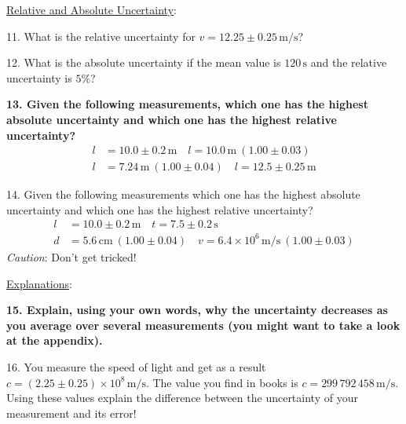 \noindent \underline{Relative and Absolute Uncertainty}:\myskip

11. What is the relative uncertainty for $v = 12.25 \pm 0.25\,\mathrm{m/s}$?\myskip

12. What is the absolute uncertainty if the mean value is $120\,\mathrm{s}$ and the relative uncertainty is $5\%$?\myskip

{\bf{13. Given the following measurements, which one has the highest absolute uncertainty and which one has the highest relative uncertainty?}}
\begin{align*}
    l &= 10.0 \pm 0.2\,\mathrm{m} \quad   l = 10.0\,\mathrm{m}\: (1.00 \pm 0.03)   \\
    l &= 7.24\,\mathrm{m}\: (1.00 \pm 0.04) \quad l = 12.5 \pm 0.25\,\mathrm{m}
\end{align*}

14. Given the following measurements which one has the highest absolute uncertainty and which one has the highest relative uncertainty?\myskip
\begin{align*}
    l &= 10.0\pm 0.2\,\mathrm{m} \quad t = 7.5\pm 0.2\,\mathrm{s} \\
    d &= 5.6\,\mathrm{cm}\:(1.00\pm 0.04) \quad v = 6.4\times 10^6\,\mathrm{m/s}\:(1.00\pm 0.03)
\end{align*}
\emph{Caution}: Don't get tricked!\myskip

\noindent \underline{Explanations}:\myskip

{\bf{15. Explain, using your own words, why the uncertainty decreases as you average over several measurements (you might want to take a look at the appendix).}} \myskip


16. You measure the speed of light and get as a result $c = (2.25 \pm 0.25)\times 10^8\,\mathrm{m/s}$. The value you find in books is $c = 299\, 792\, 458\,\mathrm{m/s}$.  Using these values explain the difference between the uncertainty of your measurement and its error!
